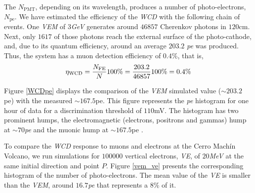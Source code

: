 \documentclass[submitting]{nst}
\begin{document}
 The $ N_{\mathrm{PMT}}$,  depending on its wavelength, produces a number of photo-electrons, $N_{\mathrm{pe}}$. We have estimated the efficiency of the \textsl{WCD} with the following chain of events. One \textsl{VEM} of $3$\textsl{GeV} generates around $46857$ Cherenkov photons in $120$cm. Next, only $1617$ of those photons reach the external surface of the photo-cathode, and, due to its quantum efficiency, around an average $203.2$ \textsl{pe} was produced. Thus, the system has a muon detection efficiency of $0.4$\%, that is,
\begin{equation}
\eta_{\mathrm{WCD}}=\frac{N_{\mathrm{FE}}}{N} 100\%=\frac{203.2}{46857}100\%=0\textnormal{.}4\%
\end{equation}

Figure \ref{WCDpe} displays the comparison of  the \textsl{VEM} simulated value ($\sim 203.2$ pe) with the measured  $\sim 167.5$pe. This figure represents the \textsl{pe} histogram for one hour of data for a discrimination threshold of $110$mV. The histogram has two prominent humps, the electromagnetic (electrons, positrons and gammas) hump at $\sim 70$\textsl{pe} and the muonic hump at $\sim 167.5$pe \cite{PenarodriguezEtal2019}.  

To compare the \textsl{WCD} response to muons and electrons  at the Cerro Machín Volcano, we run simulations for $100000$ vertical electrons, \textsl{VE}, of $20$\textsl{MeV} at the same initial direction and point $P$. Figure \ref{vem_ve} presents the corresponding histogram of the number of photo-electrons. The mean value of the \textsl{VE} is smaller than the \textsl{VEM}, around $16.7$\textsl{pe} that represents a $8$\% of it.
\end{document}
